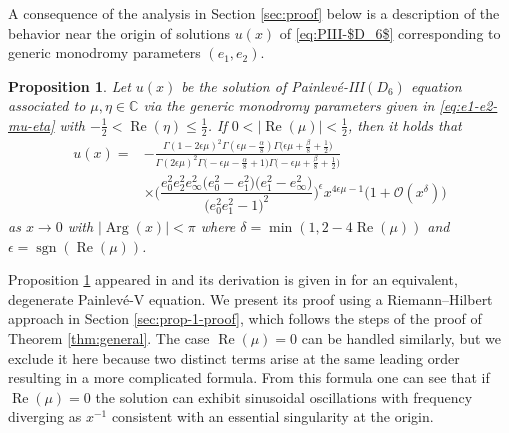 \documentclass[pdftex]{sigma}
\numberwithin{equation}{section}
\newtheorem{prop}[Theorem]{Proposition}
 { \theoremstyle{definition}
\newtheorem{Definition}[Theorem]{Definition}
\newtheorem{Note}[Theorem]{Note}
\newtheorem{Example}[Theorem]{Example}
\newtheorem{Remark}[Theorem]{Remark} }
\newcommand{\C}{{\mathbb{C}}}
\newcommand{\re}{\operatorname{Re}}
\renewcommand{\arg}{\operatorname{Arg}}
\newcommand{\sgn}{\operatorname{sgn}}
\begin{document}
A consequence of the analysis in Section \ref{sec:proof} below is a description of the behavior near the origin of solutions $u(x)$ of \eqref{eq:PIII-$D_6$} corresponding to generic monodromy parameters $(e_1, e_2)$.
\begin{prop}
\label{prop:un-zero-asymptotics}
 Let $u(x)$ be the solution of Painlev\'e-{\rm III}$(D_6)$ equation associated to $\mu, \eta \in \C$ via the generic monodromy parameters given in \eqref{eq:e1-e2-mu-eta} with $-\frac{1}{2}<\re(\eta)\leq\frac{1}{2}$. If $0<|{\re}(\mu)|<\frac{1}{2}$, then it holds that
 \begin{align}
 u(x) ={}& -\frac{ \Gamma (1 - 2\epsilon \mu)^2 \Gamma \left( \epsilon\mu -\frac{\alpha}{8}\right) \Gamma \big( \epsilon \mu+\frac{\beta}{8} + \frac{1}{2} \big)}{\Gamma (2 \epsilon \mu )^2 \Gamma \bigl(-\epsilon \mu-\frac{\alpha}{8}+1\bigr) \Gamma \bigl( - \epsilon \mu +\frac{\beta}{8} + \frac{1}{2} \bigr)} \nonumber\\
 &\times \Bigg(\dfrac{e_{0}^2 e_2^2 e_{\infty}^2\big(e_{0}^2-e_{1}^2\big) \big(e_{1}^2-e_{\infty}^2\big)}{\big(e_{0}^2 e_{1}^2-1\big)^2}\Bigg)^\epsilon
 x^{4 \epsilon \mu - 1} \big(1 + \mathcal{O}(x^\delta) \big)
 \label{eq:u-0-leading}
 \end{align}
 as $x\to 0$ with $|{\arg}(x)|<\pi$ where $\delta=\min(1,2-4\re(\mu))$ and $\epsilon = \sgn (\re (\mu))$.
\end{prop}
Proposition \ref{prop:un-zero-asymptotics} appeared in \cite[Theorem 3.2]{Jimbo} and its derivation is given in \cite{Kitaev87} for an equivalent, degenerate Painlev\'e-V equation. We present its proof using a Riemann--Hilbert approach in Section \ref{sec:prop-1-proof}, which follows the steps of the proof of Theorem \ref{thm:general}. The case $\re(\mu) = 0$ can be handled similarly, but we exclude it here because two distinct terms arise at the same leading order resulting in a more complicated formula. From this formula one can see that if $\re(\mu)=0$ the solution can exhibit sinusoidal oscillations with frequency diverging as $x^{-1}$ consistent with an essential singularity at the origin.
\end{document}
